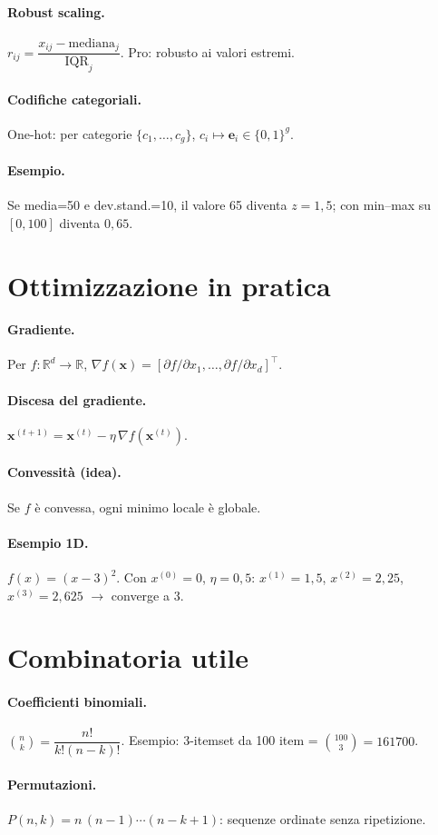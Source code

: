 \paragraph{Robust scaling.} \(r_{ij}=\dfrac{x_{ij}-\mathrm{mediana}_j}{\mathrm{IQR}_j}\). Pro: robusto ai valori estremi.
\paragraph{Codifiche categoriali.} One-hot: per categorie \(\{c_1,\dots,c_g\}\), \(c_i\mapsto\mathbf{e}_i\in\{0,1\}^g\).
\paragraph{Esempio.} Se media=50 e dev.stand.=10, il valore 65 diventa \(z=1{,}5\); con min--max su \([0,100]\) diventa \(0{,}65\).

\section{Ottimizzazione in pratica}\label{sec:opt}
\paragraph{Gradiente.} Per \(f:\mathbb{R}^d\to\mathbb{R}\), \(\nabla f(\mathbf{x})=[\partial f/\partial x_1,\dots,\partial f/\partial x_d]^\top\).
\paragraph{Discesa del gradiente.} \(\mathbf{x}^{(t+1)}=\mathbf{x}^{(t)}-\eta\,\nabla f(\mathbf{x}^{(t)})\).
\paragraph{Convessità (idea).} Se \(f\) è convessa, ogni minimo locale è globale.
\paragraph{Esempio 1D.} \(f(x)=(x-3)^2\). Con \(x^{(0)}=0\), \(\eta=0{,}5\): \(x^{(1)}=1{,}5\), \(x^{(2)}=2{,}25\), \(x^{(3)}=2{,}625\) \(\to\) converge a 3.

\section{Combinatoria utile}\label{sec:comb}
\paragraph{Coefficienti binomiali.} \(\binom{n}{k}=\dfrac{n!}{k!(n-k)!}\). Esempio: 3-itemset da 100 item = \(\binom{100}{3}=161700\).
\paragraph{Permutazioni.} \(P(n,k)=n\,(n-1)\cdots(n-k+1)\): sequenze ordinate senza ripetizione.

